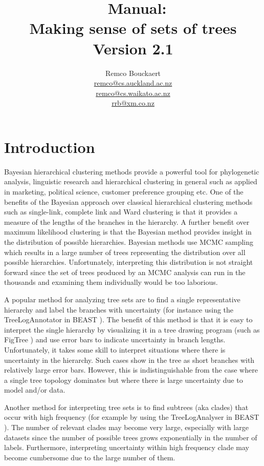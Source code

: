 \documentclass{article}
\title{\DensiTree\ Manual: \\{Making sense of sets of trees}\\Version 2.1}
\author{Remco Bouckaert\\
\url{remco@cs.auckland.ac.nz}\\
\url{remco@cs.waikato.ac.nz}\\
\url{rrb@xm.co.nz}}
\begin{document}
\maketitle
\newpage
\tableofcontents
\newpage


\section{Introduction}

Bayesian hierarchical clustering methods provide a powerful tool for phylogenetic 
analysis, linguistic research and hierarchical clustering in general such as applied
in marketing, political science, customer preference grouping etc.
One of the benefits of the Bayesian approach over classical hierarchical clustering
methods such as single-link, complete link and Ward clustering is that it provides
a measure of the lengths of the branches in the hierarchy. A further benefit over
maximum likelihood clustering is that the Bayesian method provides insight in the 
distribution of possible hierarchies.
Bayesian methods use MCMC sampling which results in a large number of trees
representing the distribution over all possible hierarchies.
Unfortunately, interpreting this distribution is not straight forward since
the set of trees produced by an MCMC analysis can run in the thousands
and examining them individually would be too laborious.

A popular method for analyzing tree sets are to find a single representative
hierarchy and label the branches with uncertainty (for instance using the
TreeLogAnnotator in BEAST \cite{BEAST}). The benefit of this method is that it is 
easy to interpret the single hierarchy by visualizing it in a tree drawing program
(such as FigTree \cite{FigTree}) and use error bars to indicate uncertainty in 
branch lengths. Unfortunately, it takes some skill to interpret situations
where there is uncertainty in the hierarchy. Such cases show in the tree
as short branches with relatively large error bars. However, this is indistinguishable
from the case where a single tree topology dominates but where there is large 
uncertainty due to model and/or data.

Another method for interpreting tree sets is to find subtrees (aka clades) that
occur with high frequency (for example by using the TreeLogAnalyser in BEAST 
\cite{BEAST}). The number of relevant clades may become very large, especially
with large datasets since the number of possible trees grows exponentially
in the number of labels. Furthermore, interpreting uncertainty within high
frequency clade may become cumbersome due to the large number of them.
\end{document}
